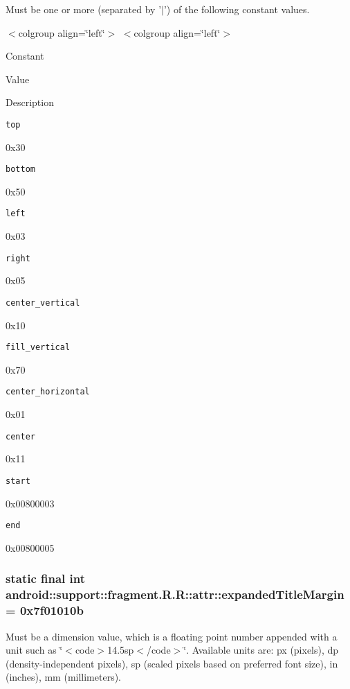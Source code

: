 Must be one or more (separated by '$|$') of the following constant values. \begin{TabularC}{0}
\hline
\end{TabularC}
$<$colgroup align=\char`\"{}left\char`\"{}$>$ $<$colgroup align=\char`\"{}left\char`\"{}$>$ 

Constant

Value

Description 

{\tt top}

0x30

{\tt bottom}

0x50

{\tt left}

0x03

{\tt right}

0x05

{\tt center\_\-vertical}

0x10

{\tt fill\_\-vertical}

0x70

{\tt center\_\-horizontal}

0x01

{\tt center}

0x11

{\tt start}

0x00800003

{\tt end}

0x00800005\hypertarget{classandroid_1_1support_1_1fragment_1_1_r_1_1attr_e0b7df3dfc93a929a9cda76ff0d4de23}{
\subsubsection[{expandedTitleMargin}]{\setlength{\rightskip}{0pt plus 5cm}static final int android::support::fragment.R.R::attr::expandedTitleMargin = 0x7f01010b}}
\label{classandroid_1_1support_1_1fragment_1_1_r_1_1attr_e0b7df3dfc93a929a9cda76ff0d4de23}


Must be a dimension value, which is a floating point number appended with a unit such as \char`\"{}$<$code$>$14.5sp$<$/code$>$\char`\"{}. Available units are: px (pixels), dp (density-independent pixels), sp (scaled pixels based on preferred font size), in (inches), mm (millimeters). 

